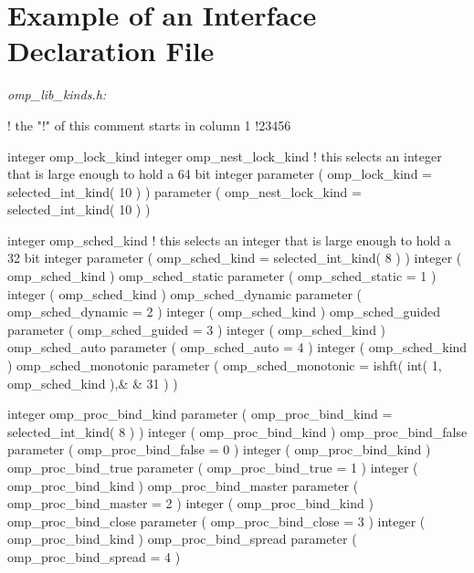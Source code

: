 {\section{Example of an Interface Declaration  File}}
\label{sec:Example of an Interface Declaration include File}
\emph{omp\_lib\_kinds.h:}
{\small \begin{ompfSyntax}
!      the "!" of this comment starts in column 1
!23456

      integer omp_lock_kind
      integer omp_nest_lock_kind
! this selects an integer that is large enough to hold a 64 bit integer
      parameter ( omp_lock_kind = selected_int_kind( 10 ) )
      parameter ( omp_nest_lock_kind = selected_int_kind( 10 ) )

      integer omp_sched_kind
! this selects an integer that is large enough to hold a 32 bit integer
      parameter ( omp_sched_kind = selected_int_kind( 8 ) )
      integer ( omp_sched_kind ) omp_sched_static
      parameter ( omp_sched_static = 1 )
      integer ( omp_sched_kind ) omp_sched_dynamic
      parameter ( omp_sched_dynamic = 2 )
      integer ( omp_sched_kind ) omp_sched_guided
      parameter ( omp_sched_guided = 3 )
      integer ( omp_sched_kind ) omp_sched_auto
      parameter ( omp_sched_auto = 4 )
      integer ( omp_sched_kind ) omp_sched_monotonic
      parameter ( omp_sched_monotonic = ishft( int( 1, omp_sched_kind ),&
     & 31 ) )

      integer omp_proc_bind_kind
      parameter ( omp_proc_bind_kind = selected_int_kind( 8 ) )
      integer ( omp_proc_bind_kind ) omp_proc_bind_false
      parameter ( omp_proc_bind_false = 0 )
      integer ( omp_proc_bind_kind ) omp_proc_bind_true
      parameter ( omp_proc_bind_true = 1 )
      integer ( omp_proc_bind_kind ) omp_proc_bind_master
      parameter ( omp_proc_bind_master = 2 )
      integer ( omp_proc_bind_kind ) omp_proc_bind_close
      parameter ( omp_proc_bind_close = 3 )
      integer ( omp_proc_bind_kind ) omp_proc_bind_spread
      parameter ( omp_proc_bind_spread = 4 )


\end{ompfSyntax}}
